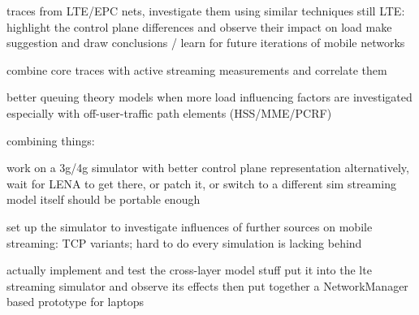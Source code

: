 
	traces from \gls{LTE}/\gls{EPC} nets, investigate them using similar techniques
	still LTE: highlight the control plane differences and observe their impact on load
	make suggestion and draw conclusions / learn for future iterations of mobile networks

	combine core traces with active streaming measurements and correlate them

	better queuing theory models when more load influencing factors are investigated
	especially with off-user-traffic path elements (HSS/MME/PCRF)



combining things:

	work on a 3g/4g simulator with better control plane representation
	alternatively, wait for LENA to get there, or patch it, or switch to a different sim
	streaming model itself should be portable enough

	set up the simulator to investigate influences of further sources on mobile streaming:
	TCP variants; hard to do every simulation is lacking behind


	actually implement and test the cross-layer model stuff
	put it into the lte streaming simulator and observe its effects
	then put together a NetworkManager based prototype for laptops









